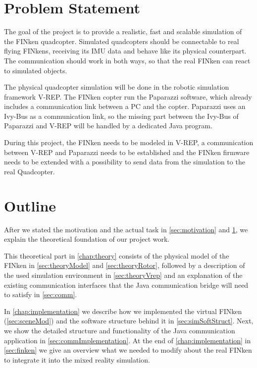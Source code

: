        


  
\section{Problem Statement}
\label{sec:problem}
    The goal of the project is to provide a realistic, fast and scalable simulation of the FINken quadcopter.  
    Simulated quadcopters should be connectable to real flying FINkens, receiving its    
    \gls{IMU} data and behave like its physical counterpart. 
    The communication should work in both ways, so that the real FINken can react to simulated objects.

The physical quadcopter simulation will be done in the robotic simulation framework V-REP\cite{vrep}. 
The FINken copter run the Paparazzi\cite{pprz} software, which already includes a communication link between a PC and the copter. 
Paparazzi uses an Ivy-Bus as a communication link, so the missing part between the Ivy-Bus of Paparazzi and V-REP will be handled by a dedicated Java program.

During this project, the FINken needs to be modeled in V-REP, a communication between V-REP and Paparazzi needs to be established and the FINken firmware needs to be extended with a possibility to send data from the simulation to the real Quadcopter.
 
         
\section{Outline}
    After we stated the motivation and the actual task in \ref{sec:motivation} and \ref{sec:problem}, we explain the theoretical foundation of our project work.
    
    This theoretical part in \ref{chap:theory} consists of the physical model of the FINken in \ref{sec:theoryModel} and \ref{sec:theoryRotor}, followed by a description of the used simulation environment in \ref{sec:theoryVrep} and an explanation of the existing communication interfaces that the Java communication bridge will need to satisfy in \ref{sec:comm}.
    
    In \ref{chap:implementation} we describe how we implemented the virtual FINken (\ref{sec:sceneMod}) and the software structure behind it in \ref{sec:simSoftStruct}. 
    Next, we show the detailed structure and functionality of the Java communication application in \ref{sec:commImplementation}.
    At the end of \ref{chap:implementation} in \ref{sec:finken} we give an overview  what we needed to modify about the real FINken to integrate it into the mixed reality simulation.
    
